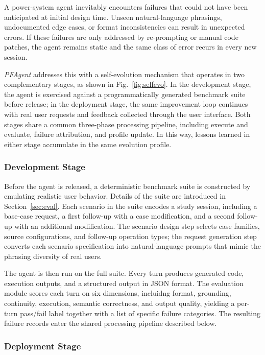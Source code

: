 \documentclass[journal]{IEEEtran}
\begin{document}
A power-system agent inevitably encounters failures that could not have been anticipated at initial design time. Unseen natural-language phrasings, undocumented edge cases, or format inconsistencies can result in unexpected errors.
If these failures are only addressed by re-prompting or manual code patches, the agent remains static and the same class of error recurs in every new session.

\emph{PFAgent} addresses this with a self-evolution mechanism that operates in two complementary stages, as shown in
Fig.~\ref{fig:selfevo}.
In the development stage, the agent is exercised against a programmatically generated benchmark suite before release; in the deployment stage, the same improvement loop continues with real user requests and feedback collected through
the user interface.
Both stages share a common three-phase processing pipeline, including execute and evaluate, failure attribution, and profile update. In this way, lessons learned in either stage accumulate in the same evolution profile.

\subsubsection{Development Stage}

Before the agent is released, a deterministic benchmark suite is constructed by emulating realistic user behavior.
Details of the suite are introduced in Section~\ref{sec:eval}.
Each scenario in the suite encodes a study session, including a base-case request, a first follow-up with a case modification, and a second follow-up with an additional modification.
The scenario design step selects case families, source configurations, and follow-up operation types;
the request generation step converts each scenario specification into natural-language prompts that mimic the phrasing diversity of real users.

The agent is then run on the full suite.
Every turn produces generated code, execution outputs, and a structured output in JSON format.
The evaluation module scores each turn on six dimensions, incluidng format, grounding, continuity, execution, semantic correctness, and output quality, yielding a per-turn pass/fail label together with a list of specific failure categories.
The resulting failure records enter the shared processing pipeline described below.

\subsubsection{Deployment Stage}
\end{document}
